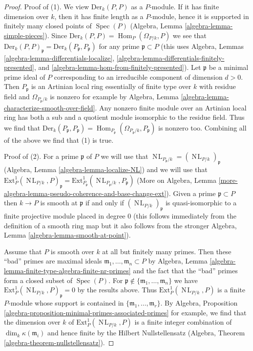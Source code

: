 \documentclass{stacks-project}
\theoremstyle{plain}
\theoremstyle{definition}
\theoremstyle{remark}
\numberwithin{equation}{subsection}
\def\Spec{\mathop{\mathrm{Spec}}}
\def\Hom{\mathop{\mathrm{Hom}}\nolimits}
\def\NL{\mathop{N\!L}\nolimits}
\begin{document}
\begin{proof}
Proof of (1). We view $\text{Der}_k(P, P)$ as a $P$-module.
If it has finite dimension over $k$, then it has finite length
as a $P$-module, hence it is supported in finitely many
closed points of $\Spec(P)$
(Algebra, Lemma \ref{algebra-lemma-simple-pieces}).
Since $\text{Der}_k(P, P) = \Hom_P(\Omega_{P/k}, P)$
we see that
$\text{Der}_k(P, P)_\mathfrak p = \text{Der}_k(P_\mathfrak p, P_\mathfrak p)$
for any prime $\mathfrak p \subset P$
(this uses Algebra, Lemmas
\ref{algebra-lemma-differentials-localize},
\ref{algebra-lemma-differentials-finitely-presented}, and
\ref{algebra-lemma-hom-from-finitely-presented}).
Let $\mathfrak p$ be a minimal prime ideal of $P$
corresponding to an irreducible component of dimension $d > 0$.
Then $P_\mathfrak p$ is an Artinian local ring
essentially of finite type over $k$ with residue field
and $\Omega_{P_\mathfrak p/k}$ is nonzero for example by
Algebra, Lemma \ref{algebra-lemma-characterize-smooth-over-field}.
Any nonzero finite module over an Artinian local ring
has both a sub and a quotient module isomorphic to the residue field.
Thus we find that
$\text{Der}_k(P_\mathfrak p, P_\mathfrak p) =
\Hom_{P_\mathfrak p}(\Omega_{P_\mathfrak p/k}, P_\mathfrak p)$
is nonzero too. Combining all of the above we find that (1) is true.

\medskip\noindent
Proof of (2). For a prime $\mathfrak p$ of $P$ we will use that
$\NL_{P_\mathfrak p/k} = (\NL_{P/k})_\mathfrak p$
(Algebra, Lemma \ref{algebra-lemma-localize-NL})
and we will
use that
$\text{Ext}_P^1(\NL_{P/k}, P)_\mathfrak p =
\text{Ext}_{P_\mathfrak p}^1(\NL_{P_\mathfrak p/k}, P_\mathfrak p)$
(More on Algebra, Lemma
\ref{more-algebra-lemma-pseudo-coherence-and-base-change-ext}).
Given a prime $\mathfrak p \subset P$
then $k \to P$ is smooth at $\mathfrak p$ if and only if
$(\NL_{P/k})_\mathfrak p$ is quasi-isomorphic
to a finite projective module placed in degree $0$ (this follows
immediately from the definition of a smooth ring map but it also
follows from the stronger Algebra, Lemma \ref{algebra-lemma-smooth-at-point}).

\medskip\noindent
Assume that $P$ is smooth over $k$ at all but finitely many primes.
Then these ``bad'' primes are maximal ideals
$\mathfrak m_1, \ldots, \mathfrak m_n \subset P$ by
Algebra, Lemma \ref{algebra-lemma-finite-type-algebra-finite-nr-primes}
and the fact that the ``bad'' primes form a closed subset of $\Spec(P)$.
For $\mathfrak p \not \in \{\mathfrak m_1, \ldots, \mathfrak m_n\}$
we have $\text{Ext}^1_P(\NL_{P/k}, P)_\mathfrak p = 0$ by the results above.
Thus $\text{Ext}^1_P(\NL_{P/k}, P)$ is a finite $P$-module
whose support is contained in $\{\mathfrak m_1, \ldots, \mathfrak m_r\}$.
By Algebra, Proposition
\ref{algebra-proposition-minimal-primes-associated-primes}
for example, we find that the dimension over $k$ of
$\text{Ext}^1_P(\NL_{P/k}, P)$ is a finite integer combination
of $\dim_k \kappa(\mathfrak m_i)$ and hence finite by
the Hilbert Nullstellensatz
(Algebra, Theorem \ref{algebra-theorem-nullstellensatz}).
\end{proof}
\end{document}
